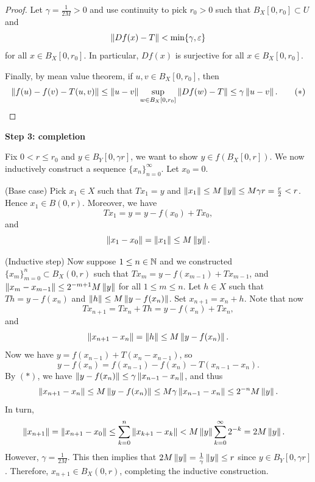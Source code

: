 \documentclass[a4paper]{article}
\renewcommand{\seqinfn}[1]{\{ #1 \}_{n=0}^\infty}
\renewcommand{\suminfk}{\sum_{k=0}^\infty}
\renewcommand{\sumk}{\sum_{k=0}}
\begin{document}
\begin{proof}
  Let $\gamma = \frac{1}{2 M} > 0$ and use continuity to pick $r_0 > 0$
  such that $B_X[0, r_0] \subset U$ and
  \[
    \left\lVert Df(x) - T\right\rVert < \min\{\gamma, \varepsilon\}
  \]
  for all $x \in B_X[0, r_0]$. In particular, $Df(x)$ is surjective for
  all $x \in B_X [0, r_0]$.

  Finally, by mean value theorem, if $u, v \in B_X[0, r_0]$, then
  \begin{equation*}
    \left\lVert f(u) - f(v) - T(u, v)\right\rVert
    \leq \left\lVert u - v\right\rVert \sup_{w \in B_X[0, r_0]} \left\lVert Df(w) - T\right\rVert
    \leq \gamma \left\lVert u - v\right\rVert.
    \tag{$*$}
  \end{equation*}
\end{proof}

\textbf{Step 3: completion}

Fix $0 < r \leq r_0$ and $y \in B_Y[0, \gamma r]$, we want to show $y \in
f (B_X [0, r])$. We now inductively construct a sequence $\seqinfn{x_n}$.
Let $x_0 = 0$.

(Base case) Pick $x_1 \in X$ such that $T x_1 = y$ and
$\left\lVert x_1\right\rVert \leq M \left\lVert y\right\rVert \leq M \gamma r = \frac{r}{2}
  < r$. Hence $x_1 \in B(0, r)$. Moreover, we have
\[
  T x_1 = y = y - f(x_0) + T x_0,
\]
and
\[
  \left\lVert x_1 - x_0\right\rVert = \left\lVert x_1\right\rVert \leq M \left\lVert y\right\rVert.
\]

(Inductive step) Now suppose $1 \leq n \in \mathbb{N}$ and we
constructed $\{x_m\}_{m=0}^n \subset B_X(0, r)$ such that
$T x_m = y - f(x_{m - 1}) + T x_{m - 1}$, and
$\left\lVert x_m - x_{m - 1}\right\rVert \leq 2^{-m + 1} M
  \left\lVert y\right\rVert$ for all $1 \leq m \leq n$.
Let $h \in X$ such that $T h = y - f(x_n)$ and
$\left\lVert h\right\rVert \leq M \left\lVert y - f(x_n)\right\rVert$. Set $x_{n + 1}
  = x_n + h$. Note that now
\[
  T x_{n + 1} = T x_n + T h = y - f(x_n) + T x_n,
\]
and
\[
  \left\lVert x_{n + 1} - x_n\right\rVert = \left\lVert h\right\rVert \leq M \left\lVert y - f(x_n)\right\rVert.
\]
Now we have $y = f(x_{n - 1}) + T(x_n - x_{n - 1})$, so
\[
  y - f(x_n) = f(x_{n - 1}) - f(x_n) - T(x_{n - 1} - x_n).
\]
By $(*)$, we have $\left\lVert y - f(x_n)\right\rVert \leq \gamma \left\lVert x_{n - 1} -
  x_n\right\rVert$, and thus
\[
  \left\lVert x_{n + 1} - x_n\right\rVert \leq M \left\lVert y - f(x_n)\right\rVert
  \leq M \gamma \left\lVert x_{n - 1} - x_n\right\rVert
  \leq 2^{- n} M \left\lVert y\right\rVert.
\]
In turn,
\[
  \begin{aligned}
    \norm{x_{n + 1}} = \norm{x_{n + 1} - x_0}
     & \leq \sumk^n \norm{x_{k+1} - x_k}
    < M \norm{y} \suminfk 2^{-k}
    = 2 M \norm{y}.
  \end{aligned}
\]
However, $\gamma = \frac{1}{2 M}$. This then implies that $2 M \left\lVert y\right\rVert
  = \frac{1}{\gamma} \left\lVert y\right\rVert \leq r$ since $y \in B_Y[0, \gamma r]$.
  Therefore, $x_{n + 1} \in B_X(0, r)$, completing the inductive
  construction.
\end{document}
